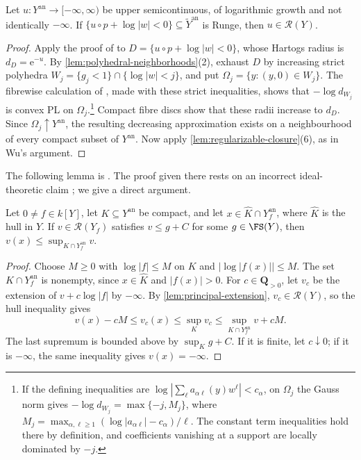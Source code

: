 \documentclass[11pt,a4paper]{article}
\newcommand{\an}{\mathrm{an}}          %
\begin{document}
\begin{lemma}\label{lem:hartogs}
Let $u\colon Y^{\an}\to[-\infty,\infty)$ be upper semicontinuous, of logarithmic growth and not identically $-\infty$. If $\{u\circ p+\log|w|<0\}\subseteq\widetilde Y^{\an}$ is Runge, then $u\in\mathcal{R}(Y)$.
\end{lemma}

\begin{proof}
Apply the proof of \cite[Proposition~5.7]{Wu26} to $D=\{u\circ p+\log|w|<0\}$, whose Hartogs radius is $d_D=\mathrm e^{-u}$. By \cref{lem:polyhedral-neighborhoods}(2), exhaust $D$ by increasing strict polyhedra $W_j=\{g_j<1\}\cap\{\log|w|<j\}$, and put $\Omega_j=\{y:(y,0)\in W_j\}$. The fibrewise calculation of \cite[Lemma~5.8]{Wu26}, made with these strict inequalities, shows that $-\log d_{W_j}$ is convex PL on $\Omega_j$.\footnote{If the defining inequalities are $\log|\sum_\ell a_{\alpha\ell}(y)w^\ell|<c_\alpha$, on $\Omega_j$ the Gauss norm gives $-\log d_{W_j}=\max\{-j,M_j\}$, where $M_j=\max_{\alpha,\ell\ge1}(\log|a_{\alpha\ell}|-c_\alpha)/\ell$. The constant term inequalities hold there by definition, and coefficients vanishing at a support are locally dominated by $-j$.} Compact fibre discs show that these radii increase to $d_D$. Since $\Omega_j\uparrow Y^{\an}$, the resulting decreasing approximation exists on a neighbourhood of every compact subset of $Y^{\an}$. Now apply \cref{lem:regularizable-closure}(6), as in Wu's argument.
\end{proof}

The following lemma is \cite[Proposition~5.10]{Wu26}. The proof given there rests on an incorrect ideal-theoretic claim \cite[Lemma~5.11]{Wu26}; we give a direct argument.

\begin{lemma}\label{lem:principal-hull}
Let $0\ne f\in k[Y]$, let $K\subseteq Y^{\an}$ be compact, and let $x\in\widehat K\cap Y_f^{\an}$, where $\widehat K$ is the hull in $Y$. If $v\in\mathcal{R}(Y_f)$ satisfies $v\le g+C$ for some $g\in\FS(Y)$, then $v(x)\le\sup_{K\cap Y_f^{\an}}v$.
\end{lemma}

\begin{proof}
Choose $M\ge0$ with $\log|f|\le M$ on $K$ and $|\log|f(x)||\le M$. The set $K\cap Y_f^{\an}$ is nonempty, since $x\in\widehat K$ and $|f(x)|>0$. For $c\in\mathbf Q_{>0}$, let $v_c$ be the extension of $v+c\log|f|$ by $-\infty$. By \cref{lem:principal-extension}, $v_c\in\mathcal{R}(Y)$, so the hull inequality gives
\[
v(x)-cM\le v_c(x)\le\sup_Kv_c\le\sup_{K\cap Y_f^{\an}}v+cM .
\]
The last supremum is bounded above by $\sup_Kg+C$. If it is finite, let $c\downarrow0$; if it is $-\infty$, the same inequality gives $v(x)=-\infty$.
\end{proof}
\end{document}

